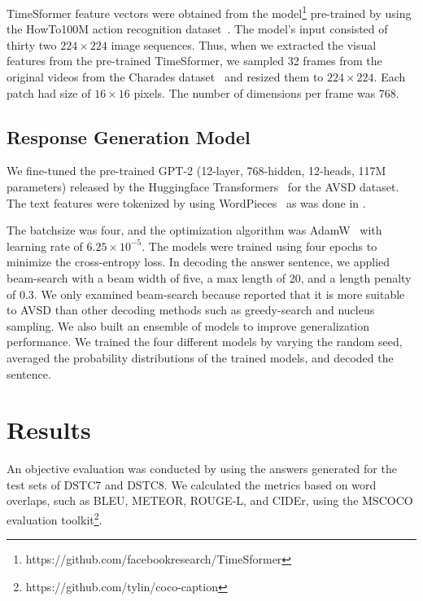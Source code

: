 \documentclass[letterpaper]{article} %
\begin{document}
TimeSformer feature vectors were obtained from the model\footnote{https://github.com/facebookresearch/TimeSformer} pre-trained by using the HowTo100M action recognition dataset~\cite{Miech2019howto100m}.
The model's input consisted of thirty two $224\times224$ image sequences.
Thus, when we extracted the visual features from the pre-trained TimeSformer, we sampled 32 frames from the original videos from the Charades dataset~\cite{Sigurdsson2016hollywood} and resized them to $224\times224$.
Each patch had size of $16\times16$ pixels.
The number of dimensions per frame was 768.


\subsection{Response Generation Model}
We fine-tuned the pre-trained GPT-2 (12-layer, 768-hidden, 12-heads, 117M parameters) released by the Huggingface Transformers~\cite{Wolf2020transformers} for the AVSD dataset.
The text features were tokenized by using WordPieces~\cite{Wu2016googles} as was done in \citet{Li2021bridging}.

The batchsize was four, and the optimization algorithm was AdamW~\cite{Loshchilov2017decoupled} with learning rate of $6.25 \times 10^{-5}$.
The models were trained using four epochs to minimize the cross-entropy loss.
In decoding the answer sentence, we applied beam-search with a beam width of five, a max length of 20, and a length penalty of 0.3.
We only examined beam-search because \citet{Li2021bridging} reported that it is more suitable to AVSD than other decoding methods such as greedy-search and nucleus sampling.
We also built an ensemble of models to improve generalization performance.
We trained the four different models by varying the random seed, averaged the probability distributions of the trained models, and decoded the sentence.


\section{Results}
An objective evaluation was conducted by using the answers generated for the test sets of DSTC7 and DSTC8.
We calculated the metrics based on word overlaps, such as BLEU, METEOR, ROUGE-L, and CIDEr, using the MSCOCO evaluation toolkit\footnote{https://github.com/tylin/coco-caption}.
\end{document}
